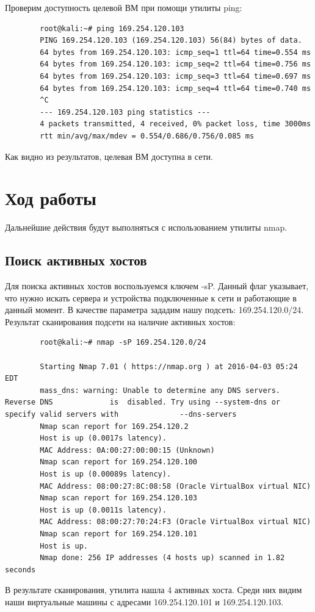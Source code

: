 \documentclass[10pt,a4paper]{report}
\begin{document}
		Проверим доступность целевой ВМ при помощи утилиты ping:
		\begin{verbatim}
		root@kali:~# ping 169.254.120.103
		PING 169.254.120.103 (169.254.120.103) 56(84) bytes of data.
		64 bytes from 169.254.120.103: icmp_seq=1 ttl=64 time=0.554 ms
		64 bytes from 169.254.120.103: icmp_seq=2 ttl=64 time=0.756 ms
		64 bytes from 169.254.120.103: icmp_seq=3 ttl=64 time=0.697 ms
		64 bytes from 169.254.120.103: icmp_seq=4 ttl=64 time=0.740 ms
		^C
		--- 169.254.120.103 ping statistics ---
		4 packets transmitted, 4 received, 0% packet loss, time 3000ms
		rtt min/avg/max/mdev = 0.554/0.686/0.756/0.085 ms

		\end{verbatim}
		Как видно из результатов, целевая ВМ доступна в сети.

\section{Ход работы}		
		
	Дальнейшие действия будут выполняться с использованием утилиты nmap.
	\subsection{Поиск активных хостов}
	Для поиска активных хостов воспользуемся ключем -sP. Данный флаг указывает, что нужно искать сервера и устройства подключенные к сети и работающие в данный момент. В качестве параметра зададим нашу подсеть: 169.254.120.0/24.		
		Результат сканирования подсети на наличие активных хостов:
		\begin{verbatim}
		root@kali:~# nmap -sP 169.254.120.0/24

		Starting Nmap 7.01 ( https://nmap.org ) at 2016-04-03 05:24 EDT
		mass_dns: warning: Unable to determine any DNS servers. Reverse DNS 			is 	disabled. Try using --system-dns or specify valid servers with 				--dns-servers
		Nmap scan report for 169.254.120.2
		Host is up (0.0017s latency).
		MAC Address: 0A:00:27:00:00:15 (Unknown)
		Nmap scan report for 169.254.120.100
		Host is up (0.00089s latency).
		MAC Address: 08:00:27:8C:08:58 (Oracle VirtualBox virtual NIC)
		Nmap scan report for 169.254.120.103
		Host is up (0.0011s latency).
		MAC Address: 08:00:27:70:24:F3 (Oracle VirtualBox virtual NIC)
		Nmap scan report for 169.254.120.101
		Host is up.
		Nmap done: 256 IP addresses (4 hosts up) scanned in 1.82 seconds
		\end{verbatim}
		
		В результате сканирования, утилита нашла 4 активных хоста. Среди них видим наши виртуальные машины с адресами 169.254.120.101 и 169.254.120.103. 
		
\end{document}
